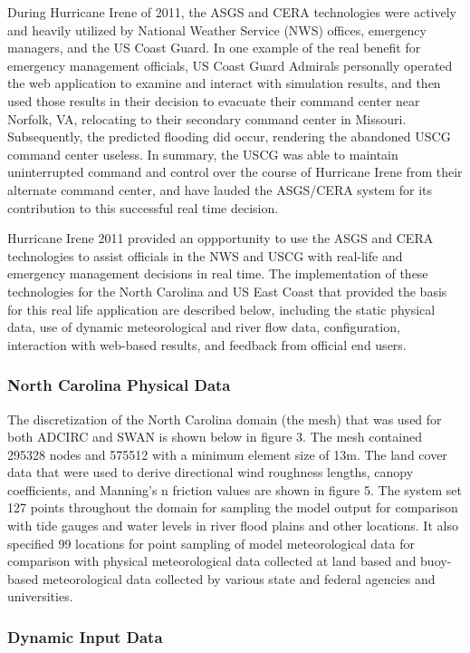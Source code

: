 \documentclass[12pt]{article}
\begin{document}
During Hurricane Irene of 2011, the ASGS and CERA technologies were 
actively and heavily utilized by National Weather Service (NWS) 
offices, emergency managers, and the US Coast Guard. In one example 
of the real benefit for emergency management officials, US Coast 
Guard Admirals personally operated the web application to examine 
and interact with simulation results, and then used those results in 
their decision to evacuate their command center near Norfolk, VA, 
relocating to their secondary command center in Missouri. 
Subsequently, the predicted flooding did occur, rendering the 
abandoned USCG command center useless. In summary, the USCG was able 
to maintain uninterrupted command and control over the course of 
Hurricane Irene from their alternate command center, and have lauded 
the ASGS/CERA system for its contribution to this successful 
real time decision.

Hurricane Irene 2011 provided an oppportunity to use the ASGS and 
CERA technologies to assist officials in the NWS and USCG with 
real-life and emergency management decisions in real time. The 
implementation of these technologies for the North Carolina and US 
East Coast that provided the basis for this real life application 
are described below, including the static physical data, use of 
dynamic meteorological and river flow data, configuration, 
interaction with web-based results, and feedback from official end 
users. 

\subsubsection{North Carolina Physical Data}

The discretization of the North Carolina domain (the mesh) that was 
used for both ADCIRC and SWAN is shown below in figure 3. The mesh 
contained 295328 nodes and 575512 with a minimum element size of 
13m. The land cover data that were used to derive directional wind 
roughness lengths, canopy coefficients, and Manning's n friction 
values are shown in figure 5. The system set 127 points throughout 
the domain for sampling the model output for comparison with tide 
gauges and water levels in river flood plains and other locations. 
It also specified 99 locations for point sampling of model 
meteorological data for comparison with physical meteorological data 
collected at land based and buoy-based meteorological data collected 
by various state and federal agencies and universities.

\subsubsection{Dynamic Input Data}
\end{document}
